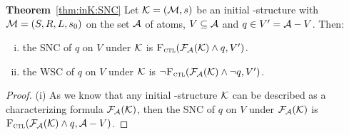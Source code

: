 \documentclass{article}
\begin{document}
 \noindent \textbf{Theorem}~\ref{thm:inK:SNC} Let ${\cal K}= ({\cal M}, s)$ be an initial \MPK-structure with ${\cal M}=(S,R,L,s_0)$ on the set ${\cal A}$ of atoms, $V \subseteq {\cal A}$ and $q\in V' = {\cal A} - V$. Then:
  \begin{enumerate}[(i)]
   \item the SNC of $q$ on $V$ under ${\cal K}$ is ${\textsc{F}_{\textsc{ctl}}}({\cal F}_{{\cal A}}({\cal K}) \wedge q, V')$.
   \item the WSC of $q$ on $V$ under ${\cal K}$ is $\neg {\textsc{F}_{\textsc{ctl}}}({\cal F}_{{\cal A}}({\cal K}) \wedge \neg q, V')$.
  \end{enumerate}
 \begin{proof}
 (i)
 As we know that any initial \MPK-structure ${\cal K}$ can be described as a characterizing formula ${\cal F}_{{\cal A}}({\cal K})$, then the SNC of $q$ on $V$ under ${\cal F}_{{\cal A}}({\cal K})$ is ${\textsc{F}_{\textsc{ctl}}}({\cal F}_{{\cal A}}({\cal K}) \wedge q, {\cal A} - V)$.



\end{proof}
\end{document}
